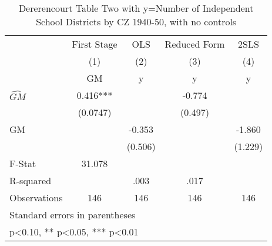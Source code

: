 \begin{table}[htbp]\centering
\def\sym#1{\ifmmode^{#1}\else\(^{#1}\)\fi}
\caption{Dererencourt Table Two with y=Number of Independent School Districts by CZ 1940-50, with no controls}
\begin{tabular}{l*{4}{c}}
\toprule
                    & First Stage   &         OLS   &Reduced Form   &        2SLS   \\
                    &\multicolumn{1}{c}{(1)}&\multicolumn{1}{c}{(2)}&\multicolumn{1}{c}{(3)}&\multicolumn{1}{c}{(4)}\\
                    &\multicolumn{1}{c}{GM}&\multicolumn{1}{c}{y}&\multicolumn{1}{c}{y}&\multicolumn{1}{c}{y}\\
\midrule
$\hat{GM}$          &       0.416***&               &      -0.774   &               \\
                    &    (0.0747)   &               &     (0.497)   &               \\
\addlinespace
GM                  &               &      -0.353   &               &      -1.860   \\
                    &               &     (0.506)   &               &     (1.229)   \\
\midrule
F-Stat              &      31.078   &               &               &               \\
R-squared           &               &        .003   &        .017   &               \\
Observations        &         146   &         146   &         146   &         146   \\
\bottomrule
\multicolumn{5}{l}{\footnotesize Standard errors in parentheses}\\
\multicolumn{5}{l}{\footnotesize * p<0.10, ** p<0.05, *** p<0.01}\\
\end{tabular}
\end{table}
